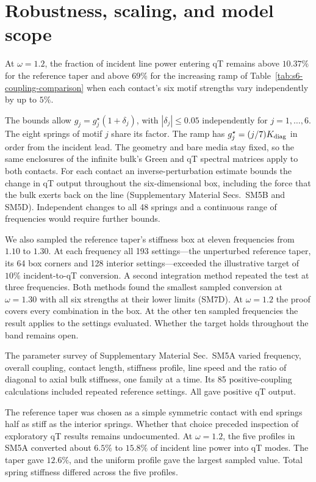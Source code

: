 \documentclass[10pt,aps,onecolumn,floatfix,notitlepage,nofootinbib,showkeys]{revtex4-2}
\begin{document}
\section{Robustness, scaling, and model scope}
\label{sec:s9-robustness}

At $\omega=1.2$, the fraction of incident line power entering qT remains above $10.37\%$ for the reference taper and above $69\%$ for the increasing ramp of Table~\ref{tab:s6-coupling-comparison} when each contact's six motif strengths vary independently by up to $5\%$.

The bounds allow $g_j=g_j^\star(1+\delta_j)$, with $|\delta_j|\leq0.05$ independently for $j=1,\ldots,6$. The eight springs of motif $j$ share its factor. The ramp has $g_j^\star=(j/7)K_{\rm diag}$ in order from the incident lead. The geometry and bare media stay fixed, so the same enclosures of the infinite bulk's Green and qT spectral matrices apply to both contacts. For each contact an inverse-perturbation estimate bounds the change in qT output throughout the six-dimensional box, including the force that the bulk exerts back on the line (Supplementary Material Secs.~SM5B and SM5D). Independent changes to all 48 springs and a continuous range of frequencies would require further bounds.

We also sampled the reference taper's stiffness box at eleven frequencies from $1.10$ to $1.30$. At each frequency all 193 settings---the unperturbed reference taper, its 64 box corners and 128 interior settings---exceeded the illustrative target of $10\%$ incident-to-qT conversion. A second integration method repeated the test at three frequencies. Both methods found the smallest sampled conversion at $\omega=1.30$ with all six strengths at their lower limits (SM7D). At $\omega=1.2$ the proof covers every combination in the box. At the other ten sampled frequencies the result applies to the settings evaluated. Whether the target holds throughout the band remains open.

The parameter survey of Supplementary Material Sec.~SM5A varied frequency, overall coupling, contact length, stiffness profile, line speed and the ratio of diagonal to axial bulk stiffness, one family at a time. Its 85 positive-coupling calculations included repeated reference settings. All gave positive qT output.

The reference taper was chosen as a simple symmetric contact with end springs half as stiff as the interior springs. Whether that choice preceded inspection of exploratory qT results remains undocumented. At $\omega=1.2$, the five profiles in SM5A converted about $6.5\%$ to $15.8\%$ of incident line power into qT modes. The taper gave $12.6\%$, and the uniform profile gave the largest sampled value. Total spring stiffness differed across the five profiles.
\end{document}
